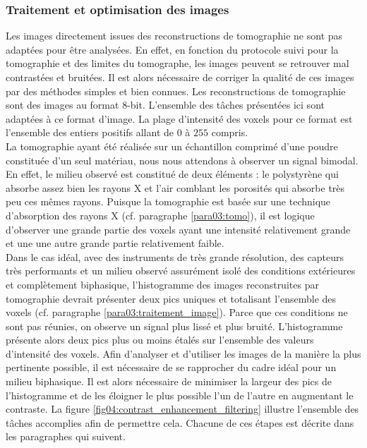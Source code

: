 		\subsubsection{Traitement et optimisation des images}
			Les images directement issues des reconstructions de tomographie ne sont pas adaptées pour être analysées. En effet, en fonction du protocole suivi pour la tomographie et des limites du tomographe, les images peuvent se retrouver mal contrastées et bruitées. Il est alors nécessaire de corriger la qualité de ces images par des méthodes simples et bien connues. Les reconstructions de tomographie sont des images au format 8-bit. L'ensemble des tâches présentées ici sont adaptées à ce format d'image. La plage d'intensité des voxels pour ce format est l'ensemble des entiers positifs allant de $0$ à $255$ compris.
			\\La tomographie ayant été réalisée sur un échantillon comprimé d'une poudre constituée d'un seul matériau, nous nous attendons à observer un signal bimodal. En effet, le milieu observé est constitué de deux éléments : le polystyrène qui absorbe assez bien les rayons X et l'air comblant les porosités qui absorbe très peu ces mêmes rayons. Puisque la tomographie est basée sur une technique d'absorption des rayons X (cf. paragraphe \ref{para03:tomo}), il est logique d'observer une grande partie des voxels ayant une intensité relativement grande et une une autre grande partie relativement faible.
			\\Dans le cas idéal, avec des instruments de très grande résolution, des capteurs très performants et un milieu observé assurément isolé des conditions extérieures et complètement biphasique, l'histogramme des images reconstruites par tomographie devrait présenter deux pics uniques et totalisant l'ensemble des voxels (cf. paragraphe \ref{para03:traitement_image}). Parce que ces conditions ne sont pas réunies, on observe un signal plus lissé et plus bruité. L'histogramme présente alors deux pics plus ou moins étalés sur l'ensemble des valeurs d'intensité des voxels. Afin d'analyser et d'utiliser les images de la manière la plus pertinente possible, il est nécessaire de se rapprocher du cadre idéal pour un milieu biphasique. Il est alors nécessaire de minimiser la largeur des pics de l'histogramme et de les éloigner le plus possible l'un de l'autre en augmentant le contraste. La figure \ref{fig04:contrast_enhancement_filtering} illustre l'ensemble des tâches accomplies afin de permettre cela. Chacune de ces étapes est décrite dans les paragraphes qui suivent.
